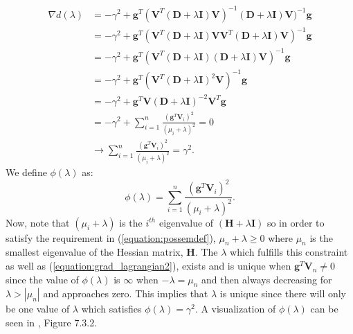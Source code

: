 \documentclass[letterpaper,12pt,titlepage,oneside,final]{book}
\begin{document}
	\begin{equation}
	\begin{aligned}
	\nabla d(\lambda) & = -\gamma^{2} + \mathbf{g}^{T}(\mathbf{V}^{T}(\mathbf{D} + \lambda\mathbf{I})\mathbf{V})^{-1}(\mathbf{D} + \lambda\mathbf{I})\mathbf{V})^{-1}\mathbf{g} \\
	& = -\gamma^{2} + \mathbf{g}^{T}(\mathbf{V}^{T}(\mathbf{D} + \lambda\mathbf{I})\mathbf{V}\mathbf{V}^{T}(\mathbf{D} + \lambda\mathbf{I})\mathbf{V})^{-1}\mathbf{g}  \\
	& = -\gamma^{2} + \mathbf{g}^{T}(\mathbf{V}^{T}(\mathbf{D} + \lambda\mathbf{I})(\mathbf{D} + \lambda\mathbf{I})\mathbf{V})^{-1}\mathbf{g}  \\ 
	& = -\gamma^{2} + \mathbf{g}^{T}(\mathbf{V}^{T}(\mathbf{D} + \lambda\mathbf{I})^{2}\mathbf{V})^{-1}\mathbf{g}  \\ 
	& = -\gamma^{2} + \mathbf{g}^{T}\mathbf{V}(\mathbf{D} + \lambda\mathbf{I})^{-2}\mathbf{V}^{T}\mathbf{g} \\
	& = -\gamma^{2} + \sum_{i=1}^{n}{\frac{(\mathbf{g}^{T}\mathbf{V}_{i})^{2}}{(\mu_{i} + \lambda)^{2}}} = 0\\ 
	&  \rightarrow \sum_{i=1}^{n}{\frac{(\mathbf{g}^{T}\mathbf{V}_{i})^{2}}{(\mu_{i} + \lambda)^{2}}} = \gamma^{2}.
	\end{aligned}
	\label{equation:grad_lagrangian2}
	\end{equation}
	We define $\phi(\lambda)$ as:
	\begin{equation}
	\phi(\lambda) = \sum_{i=1}^{n}{\frac{(\mathbf{g}^{T}\mathbf{V}_{i})^{2}}{(\mu_{i} + \lambda)^{2}}}.
	\label{phi}
	\end{equation}
	Now, note that $(\mu_{i} + \lambda)$ is the $i^{th}$ eigenvalue of $(\mathbf{H} + \lambda\mathbf{I})$ so in order to satisfy the requirement in (\ref{equation:possemdef}), $\mu_{n} + \lambda \geq 0$ where $\mu_{n}$ is the smallest eigenvalue of the Hessian matrix, $\mathbf{H}$. The $\lambda$ which fulfills this constraint as well as (\ref{equation:grad_lagrangian2}), exists and is unique when $\mathbf{g}^{T}\mathbf{V}_{n}\neq0$ since the value of $\phi(\lambda)$ is $\infty$ when $-\lambda = \mu_{n}$ and then always decreasing for $\lambda > |\mu_{n}|$ and approaches zero. This implies that $\lambda$ is unique since there will only be one value of $\lambda$ which satisfies $\phi(\lambda) = \gamma^{2}$. A visualization of $\phi(\lambda)$ can be seen in \cite{TRM.book}, Figure 7.3.2. 
\end{document}
